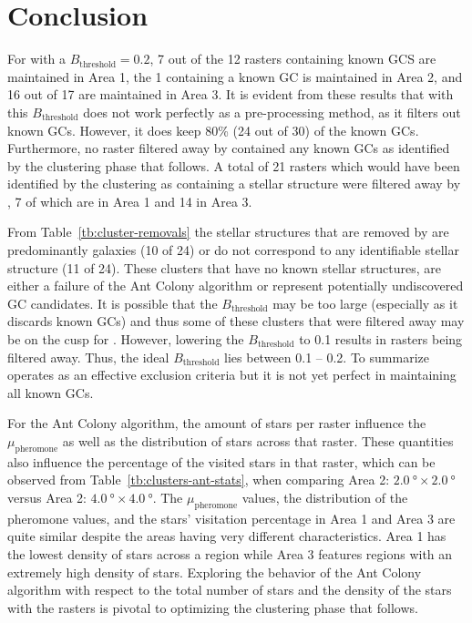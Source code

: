 \chapter{\label{chap:conclusion}Conclusion}

For \blobdog{} with a $B_{\text{threshold}} = 0.2$, 7 out of the 12 rasters containing known GCS are maintained in Area 1, the 1 containing a known GC is maintained in Area 2, and 16 out of 17 are maintained in Area 3. It is evident from these results that \blobdog{} with this $B_{\text{threshold}}$ does not work perfectly as a pre-processing method, as it filters out known GCs. However, it does keep 80\% (24 out of 30) of the known GCs. Furthermore, no raster filtered away by \blobdog{} contained any known GCs as identified by the clustering phase that follows. A total of 21 rasters which would have been identified by the clustering as containing a stellar structure were filtered away by \blobdog{}, 7 of which are in Area 1 and 14 in Area 3.

From Table~\ref{tb:cluster-removals} the stellar structures that are removed by \blobdog{} are predominantly galaxies (10 of 24) or do not correspond to any identifiable stellar structure (11 of 24). These clusters that have no known stellar structures, are either a failure of the Ant Colony algorithm or represent potentially undiscovered GC candidates. It is possible that the $B_{\text{threshold}}$ may be too large (especially as it discards known GCs) and thus some of these clusters that were filtered away may be on the cusp for \blobdog{}. However, lowering the $B_{\text{threshold}}$ to 0.1 results in  rasters being filtered away. Thus, the ideal $B_{\text{threshold}}$ lies between 0.1 -- 0.2. To summarize \blobdog{} operates as an effective exclusion criteria but it is not yet perfect in maintaining all known GCs.

For the Ant Colony algorithm, the amount of stars per raster influence the $\mu_{\text{pheromone}}$ as well as the distribution of stars across that raster. These quantities also influence the percentage of the visited stars in that raster, which can be observed from Table~\ref{tb:clusters-ant-stats}, when comparing Area 2: $\SI{2.0}{\degree}\times\SI{2.0}{\degree}$ versus Area 2: $\SI{4.0}{\degree}\times\SI{4.0}{\degree}$. The $\mu_{\text{pheromone}}$ values, the distribution of the pheromone values, and the stars' visitation percentage in Area 1 and Area 3 are quite similar despite the areas having very different characteristics. Area 1 has the lowest density of stars across a region while Area 3 features regions with an extremely high density of stars. Exploring the behavior of the Ant Colony algorithm with respect to the total number of stars and the density of the stars with the rasters is pivotal to optimizing the clustering phase that follows.

